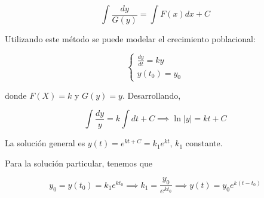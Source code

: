 \[
\int \frac{dy}{G(y)} = \int F(x) dx + C
\]

Utilizando este método se puede modelar el crecimiento poblacional:

\[
\begin{cases*}
    \frac{dy}{dt} = ky \\
    y(t_0) = y_0
\end{cases*}
\]

donde $F(X) = k$ y $G(y) = y$. Desarrollando,

\[
\int \frac{dy}{y} = k\int dt + C \implies \ln|y| = kt + C
\]

La solución general es $y(t) = e^{kt + C} = k_1e^{kt}$, $k_1$ constante.

Para la solución particular, tenemos que

\[
y_0 = y(t_0) = k_1e^{kt_0} \implies k_1 = \frac{y_0}{e^{kt_0}} \implies y(t) = y_0 e^{k(t - t_0)}
\]